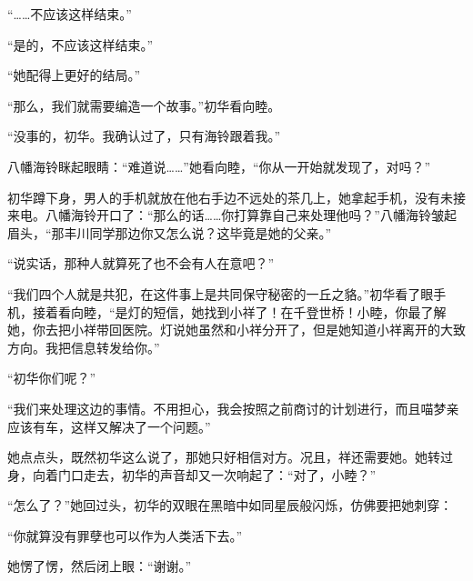 \documentclass{article}
\begin{document}
“……不应该这样结束。”



“是的，不应该这样结束。”



“她配得上更好的结局。”



“那么，我们就需要编造一个故事。”初华看向睦。



\newpage



“没事的，初华。我确认过了，只有海铃跟着我。”



八幡海铃眯起眼睛：“难道说……”她看向睦，“你从一开始就发现了，对吗？”



\newpage



初华蹲下身，男人的手机就放在他右手边不远处的茶几上，她拿起手机，没有未接来电。八幡海铃开口了：“那么的话……你打算靠自己来处理他吗？”八幡海铃皱起眉头，“那丰川同学那边你又怎么说？这毕竟是她的父亲。”



“说实话，那种人就算死了也不会有人在意吧？”



\newpage



“我们四个人就是共犯，在这件事上是共同保守秘密的一丘之貉。”初华看了眼手机，接着看向睦，“是灯的短信，她找到小祥了！在千登世桥！小睦，你最了解她，你去把小祥带回医院。灯说她虽然和小祥分开了，但是她知道小祥离开的大致方向。我把信息转发给你。”



“初华你们呢？”



“我们来处理这边的事情。不用担心，我会按照之前商讨的计划进行，而且喵梦亲应该有车，这样又解决了一个问题。”



她点点头，既然初华这么说了，那她只好相信对方。况且，祥还需要她。她转过身，向着门口走去，初华的声音却又一次响起了：“对了，小睦？”



“怎么了？”她回过头，初华的双眼在黑暗中如同星辰般闪烁，仿佛要把她刺穿：



“你就算没有罪孽也可以作为人类活下去。”



她愣了愣，然后闭上眼：“谢谢。”
\end{document}
